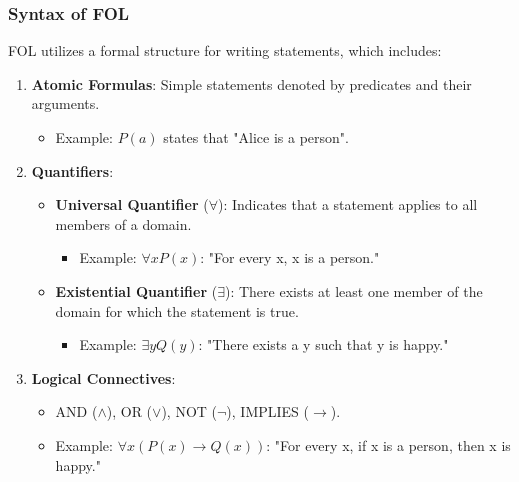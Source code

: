 \documentclass[aspectratio=169]{beamer}
\begin{document}
\begin{frame}[fragile]
    \frametitle{Syntax of FOL}
    FOL utilizes a formal structure for writing statements, which includes:
    \begin{enumerate}
        \item \textbf{Atomic Formulas}: Simple statements denoted by predicates and their arguments.
        \begin{itemize}
            \item Example: \( P(a) \) states that "Alice is a person".
        \end{itemize}
        
        \item \textbf{Quantifiers}:
        \begin{itemize}
            \item \textbf{Universal Quantifier} (\( \forall \)): Indicates that a statement applies to all members of a domain.
            \begin{itemize}
                \item Example: \( \forall x P(x) \): "For every x, x is a person."
            \end{itemize}
            \item \textbf{Existential Quantifier} (\( \exists \)): There exists at least one member of the domain for which the statement is true.
            \begin{itemize}
                \item Example: \( \exists y Q(y) \): "There exists a y such that y is happy."
            \end{itemize}
        \end{itemize}
        
        \item \textbf{Logical Connectives}: 
        \begin{itemize}
            \item AND (\( \land \)), OR (\( \lor \)), NOT (\( \neg \)), IMPLIES (\( \rightarrow \)).
            \item Example: \( \forall x (P(x) \rightarrow Q(x)) \): "For every x, if x is a person, then x is happy."
        \end{itemize}
    \end{enumerate}
\end{frame}
\end{document}
